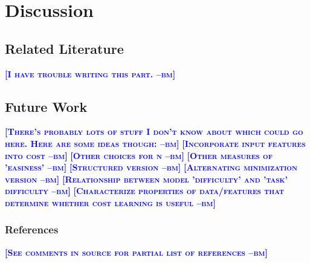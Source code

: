 \documentclass{article} %
\newcommand{\bmcomment}[1]{\textcolor{blue}{\textsc{\textbf{[#1 --bm]}}}}
\begin{document}
\section{Discussion}

\subsection{Related Literature}

\bmcomment{I have trouble writing this part.}

\subsection{Future Work}

\bmcomment{There's probably lots of stuff I don't know about
which could go here.  Here are some ideas though:}
\bmcomment{Incorporate input features into cost}
\bmcomment{Other choices for n}
\bmcomment{Other measures of 'easiness'}
\bmcomment{Structured version}
\bmcomment{Alternating minimization version}
\bmcomment{Relationship between model 'difficulty' and 'task' difficulty}
\bmcomment{Characterize properties of data/features that determine whether cost learning is useful}



\subsubsection*{References}

\bmcomment{See comments in source for partial list of references}
\end{document}
